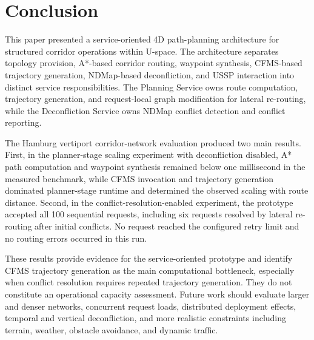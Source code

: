 \section{Conclusion}
\label{sec:conclusion}

This paper presented a service-oriented 4D path-planning architecture for structured corridor operations within U-space. The architecture separates topology provision, A*-based corridor routing, waypoint synthesis, CFMS-based trajectory generation, NDMap-based deconfliction, and USSP interaction into distinct service responsibilities. The Planning Service owns route computation, trajectory generation, and request-local graph modification for lateral re-routing, while the Deconfliction Service owns NDMap conflict detection and conflict reporting.

The Hamburg vertiport corridor-network evaluation produced two main results. First, in the planner-stage scaling experiment with deconfliction disabled, A* path computation and waypoint synthesis remained below one millisecond in the measured benchmark, while CFMS invocation and trajectory generation dominated planner-stage runtime and determined the observed scaling with route distance. Second, in the conflict-resolution-enabled experiment, the prototype accepted all 100 sequential requests, including six requests resolved by lateral re-routing after initial conflicts. No request reached the configured retry limit and no routing errors occurred in this run.

These results provide evidence for the service-oriented prototype and identify CFMS trajectory generation as the main computational bottleneck, especially when conflict resolution requires repeated trajectory generation. They do not constitute an operational capacity assessment. Future work should evaluate larger and denser networks, concurrent request loads, distributed deployment effects, temporal and vertical deconfliction, and more realistic constraints including terrain, weather, obstacle avoidance, and dynamic traffic.
